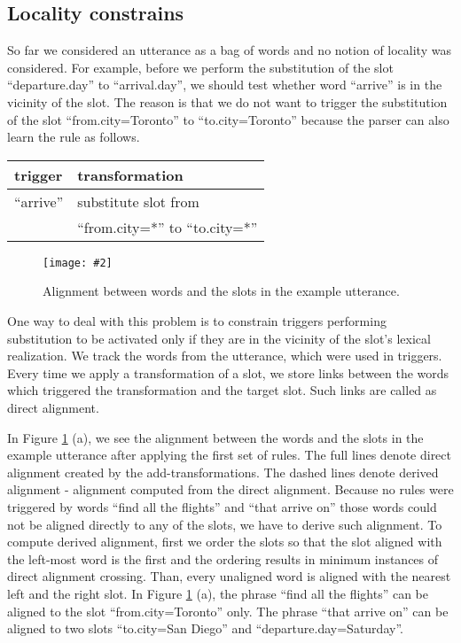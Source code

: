 \documentclass{article}
\newcommand{\fgrparam}[4]{
  \begin{figure}[htbp]
    \begin{center}
      \leavevmode
      \texttt{[image: \#2]}
    \end{center}
    \vspace{-0.5cm}
    \caption{#4}
    \label{#3}
  \end{figure}
}
\begin{document}
\subsection{Locality constrains} \label{sec:locality:constrain}

So far we considered an utterance as a bag of words and no notion of locality was considered. For example, before we perform the substitution of the slot ``departure.day'' to ``arrival.day'', we should test whether word ``arrive'' is in the vicinity of the slot. The reason is that we do not want to trigger the substitution of the slot ``from.city=Toronto'' to ``to.city=Toronto'' because the parser can also learn the rule as follows. 

\vspace{.15cm}
\begin{tabular}{ll}
  trigger & transformation \\
  \hline 
  ``arrive''            & substitute slot from\\
                        & ``from.city=*'' to ``to.city=*'' \\
\end{tabular} 
\vspace{.15cm}
\fgrparam{width=8cm}{./fig/words-slots-alignment.pdf}{fig:alignment}{Alignment between words and the slots in the example utterance.}


One way to deal with this problem is to constrain triggers performing substitution to be activated only if they are in the vicinity of the slot's lexical realization. We track the words from the utterance, which were used in triggers. Every time we apply a transformation of a slot, we store links between the words which triggered the transformation and the target slot. Such links are called as direct alignment. 


In Figure \ref{fig:alignment} (a), we see the alignment between the words and the slots in the example utterance after applying the first set of rules. The full lines denote direct alignment created by the add-transformations. The dashed lines denote derived alignment - alignment computed from the direct alignment. Because no rules were triggered by words ``find all the flights'' and ``that arrive on'' those words could not be aligned directly to any of the slots, we have to derive such alignment. To compute derived alignment, first we order the slots so that the slot aligned with the left-most word is the first and the ordering results in minimum instances of direct alignment crossing. Than, every unaligned word is aligned with the nearest left and the right slot. In Figure \ref{fig:alignment} (a), the phrase ``find all the flights'' can be aligned to the slot ``from.city=Toronto'' only. The phrase ``that arrive on'' can be aligned to two slots ``to.city=San Diego'' and ``departure.day=Saturday''.
\end{document}
